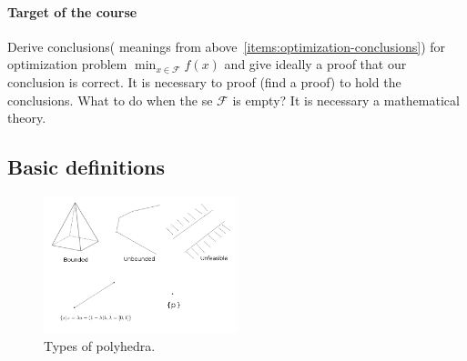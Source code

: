 \documentclass[main]{subfiles}
\begin{document}
\paragraph{Target of the course}
Derive conclusions( meanings from above~\ref{items:optimization-conclusions}) for optimization
problem $\displaystyle \min_{x \in \mathcal{F}} f(x)$ and give ideally a proof
that our conclusion is correct. It is necessary to proof (find a proof) to hold
the conclusions. What to do when the se $\mathcal{F}$ is empty? It is necessary
a mathematical theory.

\subsection{Basic definitions}
\begin{figure}[!h]
  \label{fig:convex-set}
  \caption{Types of polyhedra.}
  \centering
    \includegraphics[width=0.5\textwidth]{imgs/polyhedra-types.png}
\end{figure}
\end{document}
